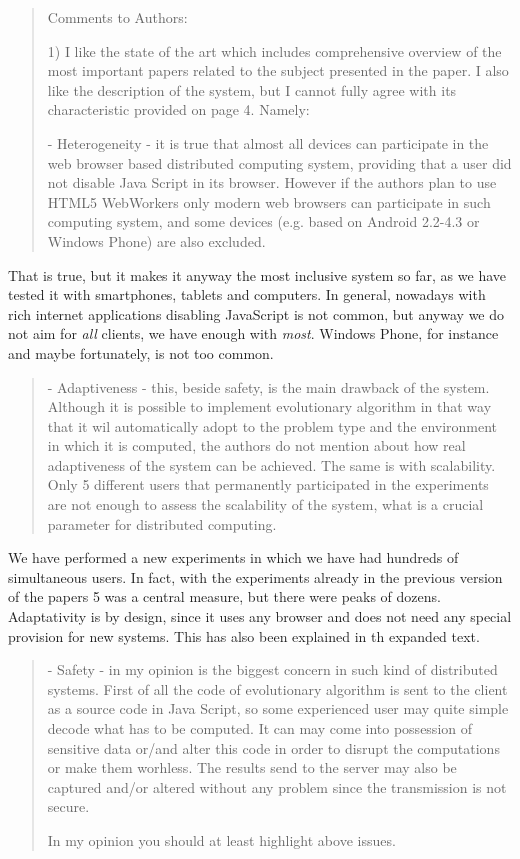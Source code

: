 \documentclass[preprint]{elsarticle}
\begin{document}
\begin{quote}
Comments to Authors:

1) I like the state of the art which includes comprehensive overview of the most important papers related
to the subject presented in the paper. I also like the description of the system, but I cannot fully agree
with its characteristic provided on page 4. Namely:
 
 - Heterogeneity - it is true that almost all devices can participate in the web browser based
 distributed computing system, providing that a user did not disable Java Script in its browser.
 However if the authors plan to use HTML5 WebWorkers only modern web browsers can
 participate in such computing system, and some devices (e.g. based on Android 2.2-4.3 or
 Windows Phone) are also excluded.
 
\end{quote}

That is true, but it makes it anyway the most inclusive system so
far, as we have tested it with smartphones, tablets and computers. In
general, nowadays with rich internet applications disabling JavaScript
is not common, but anyway we do not aim for {\em all} clients, we have
enough with {\em most}. Windows Phone, for instance and maybe
fortunately, is not too common.

\begin{quote}
 - Adaptiveness - this, beside safety, is the main drawback of the system. Although it is possible to
 implement evolutionary algorithm in that way that it wil automatically adopt to the problem type
 and the environment in which it is computed, the authors do not mention about how real
 adaptiveness of the system can be achieved. The same is with scalability. Only 5 different users
 that permanently participated in the experiments are not enough to assess the scalability of the
 system, what is a crucial parameter for distributed computing.
\end{quote}

We have performed a new experiments in which we have had hundreds of
simultaneous users. In fact, with the experiments already in the
previous version of the papers 5 was a central measure, but there were
peaks of dozens. 
Adaptativity is by design, since it uses any browser and does not need
any special provision for new systems. This has also been explained in
th expanded text.

\begin{quote} 

 - Safety - in my opinion is the biggest concern in such kind of distributed systems. First of all the
 code of evolutionary algorithm is sent to the client as a source code in Java Script, so some
 experienced user may quite simple decode what has to be computed. It can may come into
 possession of sensitive data or/and alter this code in order to disrupt the computations or make
 them worhless. The results send to the server may also be captured and/or altered without any
 problem since the transmission is not secure.

 In my opinion you should at least highlight above issues.
\end{quote}
\end{document}
